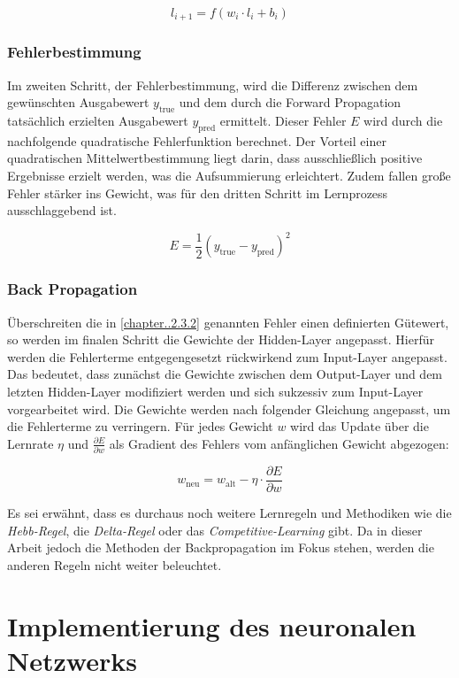 \documentclass[a4paper, 12pt]{article}
\begin{document}
\[
l_{i+1} = f(w_i \cdot l_i + b_i)
\]

\newpage %

\subsubsection{Fehlerbestimmung}\label{chapter..2.3.2}
Im zweiten Schritt, der Fehlerbestimmung, wird die Differenz zwischen dem gewünschten Ausgabewert 
$y_\text{true}$ und dem durch die Forward Propagation tatsächlich erzielten Ausgabewert 
$y_\text{pred}$ ermittelt. Dieser Fehler $E$ wird durch die nachfolgende quadratische Fehlerfunktion 
berechnet. Der Vorteil einer quadratischen Mittelwertbestimmung liegt darin, dass ausschließlich 
positive Ergebnisse erzielt werden, was die Aufsummierung erleichtert. Zudem fallen große Fehler 
stärker ins Gewicht, was für den dritten Schritt im Lernprozess ausschlaggebend ist.

\[
E = \frac{1}{2} (y_\text{true} - y_\text{pred})^2
\]

\subsubsection{Back Propagation}\label{chapter..2.3.3}
Überschreiten die in \autoref{chapter..2.3.2} genannten Fehler einen definierten Gütewert, so werden 
im finalen Schritt die Gewichte der Hidden-Layer angepasst. Hierfür werden die Fehlerterme 
entgegengesetzt rückwirkend zum Input-Layer angepasst. Das bedeutet, dass zunächst die Gewichte 
zwischen dem Output-Layer und dem letzten Hidden-Layer modifiziert werden und sich sukzessiv zum 
Input-Layer vorgearbeitet wird. Die Gewichte werden nach folgender Gleichung angepasst, um die 
Fehlerterme zu verringern. Für jedes Gewicht $w$ wird das Update über die Lernrate $\eta$ und 
$\frac{\partial E}{\partial w}$ als Gradient des Fehlers vom anfänglichen Gewicht abgezogen:

\[
w_\text{neu} = w_\text{alt} - \eta \cdot \frac{\partial E}{\partial w}
\]

Es sei erwähnt, dass es durchaus noch weitere Lernregeln und Methodiken wie die \textit{Hebb-Regel}, 
die \textit{Delta-Regel} oder das \textit{Competitive-Learning} gibt. Da in dieser Arbeit jedoch 
die Methoden der Backpropagation im Fokus stehen, werden die anderen Regeln nicht weiter beleuchtet.

\newpage %

\section{Implementierung des neuronalen Netzwerks}\label{chapter..3}
\end{document}
